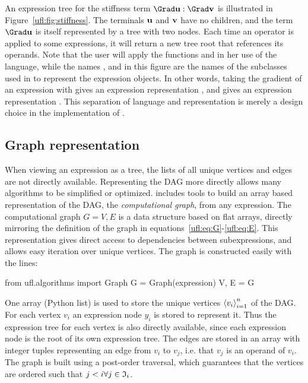 An expression tree for the stiffness term $\Grad\uu :\Grad\vv$ is
illustrated in Figure~\ref{ufl:fig:stiffness}.  The terminals $\mathbf{u}$
and $\mathbf{v}$ have no children, and the term $\Grad\uu$ is itself
represented by a tree with two nodes. Each time an operator is applied
to some expressions, it will return a new tree root that references
its operands. Note that the user will apply the functions 
and  in her use of the language, while the names
,  and  in this figure
are the names of the  subclasses used in \ufl{} to
represent the expression objects.  In other words, taking the gradient
of an expression with  gives an expression
representation , and  gives an
expression representation . This separation of
language and representation is merely a design choice in the
implementation of \ufl{}.

\subsection{Graph representation} \label{ufl:sec:graphs}


When viewing an expression as a tree, the lists of all unique vertices
and edges are not directly available. Representing the DAG more
directly allows many algorithms to be simplified or optimized.
\ufl{} includes tools to build an array based representation of the DAG,
the \emph{computational graph}, from any expression.
The computational graph $G = V, E$ is a data structure based on flat
arrays, directly mirroring the definition of the graph in
equations~\eqref{ufl:eq:G}-\eqref{ufl:eq:E}.
This representation gives direct access to dependencies between
subexpressions, and allows easy iteration over unique vertices.
The graph is constructed easily with the lines:
\begin{python}
from ufl.algorithms import Graph
G = Graph(expression)
V, E = G
\end{python}
One array (Python list)
 is used to store the unique vertices $\left\langle{v_i}\right\rangle_{i=1}^n$ of the
DAG.  For each vertex $v_i$ an expression node $y_i$ is stored to
represent it.  Thus the expression tree for each vertex is also
directly available, since each expression node is the root of its own
expression tree. The edges are stored in an array  with
integer tuples  representing an edge from $v_i$ to $v_j$,
i.e. that $v_j$ is an operand of $v_i$.  The graph is built using a
post-order traversal, which guarantees that the vertices are ordered
such that $j < i \forall j \in \mathfrak{I}_i$.

